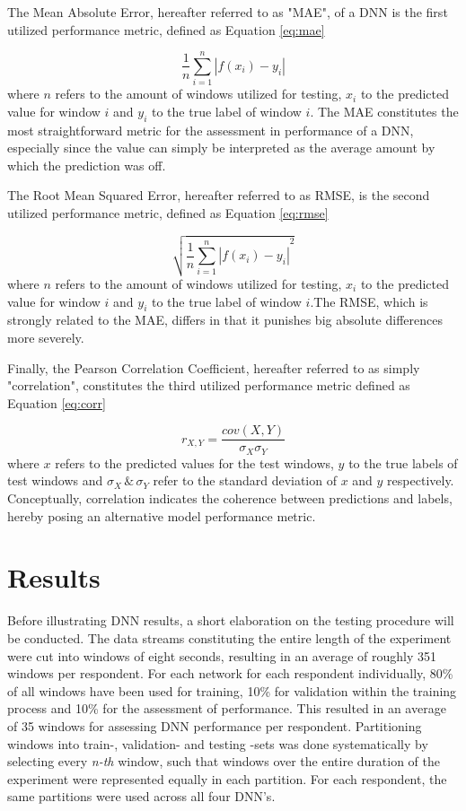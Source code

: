 \documentclass[12pt]{article}
\begin{document}
The Mean Absolute Error, hereafter referred to as "MAE",  of a DNN is the first utilized performance metric, defined as Equation \ref{eq:mae}

\begin{equation}
\label{eq:mae}
\frac{1}{n} \sum^n_{i=1}|f(x_i)-y_i| 
\end{equation}
where $n$ refers to the amount of windows utilized for testing, $x_i$ to the predicted value for window $i$ and $y_i$ to the true label of window $i$.
The MAE constitutes the most straightforward metric for the assessment in performance of a DNN, especially since the value can simply be interpreted as the average amount by which the prediction was off.

The Root Mean Squared Error, hereafter referred to as RMSE, is the second utilized performance metric, defined as Equation \ref{eq:rmse}

\begin{equation}
\label{eq:rmse}
\sqrt{{\frac{1}{n} \sum^n_{i=1}|f(x_i)-y_i|}^2}
\end{equation}
where $n$ refers to the amount of windows utilized for testing, $x_i$ to the predicted value for window $i$ and $y_i$ to the true label of window $i$.The RMSE, which is strongly related to the MAE, differs in that it punishes big absolute differences more severely. 

Finally, the Pearson Correlation Coefficient, hereafter referred to as simply "correlation", constitutes the third utilized performance metric defined as Equation  \ref{eq:corr}

\begin{equation}
\label{eq:corr}
r_{X,Y} = \frac{cov(X,Y)}{\sigma_{X} \sigma_{Y}}
\end{equation}
where $x$ refers to the predicted values for the test windows,  $y$ to the true labels of test windows and $\sigma_{X}\, \& \,\sigma_{Y}$ refer to the standard deviation of $x$ and $y$ respectively.  Conceptually, correlation indicates the coherence between predictions and labels, hereby posing an alternative model performance metric. 

\newpage
\section{Results}
Before illustrating DNN results,  a short elaboration on the testing procedure will be conducted.  The data streams constituting the entire length of the experiment were cut into windows of eight seconds, resulting in an average of roughly 351 windows per respondent. For each network for each respondent individually,  80\% of all windows have been used for training, 10\% for validation within the training process and 10\% for the assessment of performance. This resulted in an average of 35 windows for assessing DNN performance per respondent.  Partitioning windows into train-, validation- and testing -sets was done systematically by selecting every \textit{n-th} window, such that windows over the entire duration of the experiment were represented equally in each partition.  For each respondent, the same partitions were used across all four DNN's.
\end{document}
